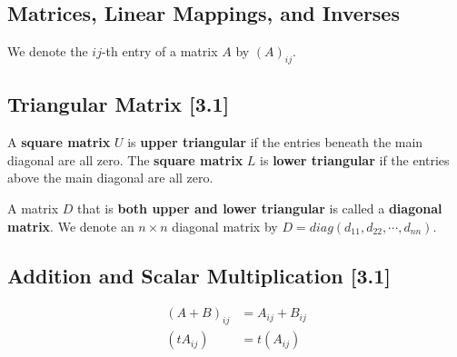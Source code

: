 \documentclass[a4paper,9pt]{extarticle}
\begin{document}
\begin{multicols*}{2}



\section{Matrices, Linear Mappings, and Inverses}
We denote the $ij$-th entry of a matrix $A$ by $(A)_{ij}$.


\subsection{Triangular Matrix [3.1]}
A \textbf{square matrix} $U$ is \textbf{upper triangular} if the entries beneath the main diagonal are all zero. The \textbf{square matrix} $L$ is \textbf{lower triangular} if the entries above the main diagonal are all zero.

A matrix $D$ that is \textbf{both upper and lower triangular} is called a \textbf{diagonal matrix}. We denote an $n \times n$ diagonal matrix by $D = diag(d_{11}, d_{22}, \cdots, d_{nn})$.


\subsection{Addition and Scalar Multiplication [3.1]}
\begin{equation} \label{3.1-1}
    \begin{split}
        (A + B)_{ij} & = A_{ij} + B_{ij} \\
        (t A_{ij}) & = t (A_{ij})
    \end{split}
\end{equation}


\end{multicols*}
\end{document}
